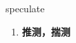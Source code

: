 
\begin{frame}
{\huge speculate}
\begin{center}
\begin{enumerate}\Large
  \item \textbf{推测，揣测}
\end{enumerate}
\end{center}
\end{frame}
